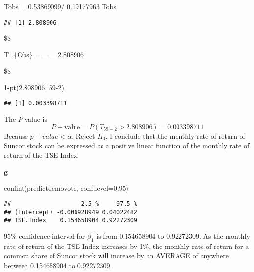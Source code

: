 \documentclass[
]{article}
\newenvironment{Shaded}{\begin{snugshade}}{\end{snugshade}}
\newcommand{\AttributeTok}[1]{\textcolor[rgb]{0.77,0.63,0.00}{#1}}
\newcommand{\DecValTok}[1]{\textcolor[rgb]{0.00,0.00,0.81}{#1}}
\newcommand{\FloatTok}[1]{\textcolor[rgb]{0.00,0.00,0.81}{#1}}
\newcommand{\FunctionTok}[1]{\textcolor[rgb]{0.00,0.00,0.00}{#1}}
\newcommand{\NormalTok}[1]{#1}
\newcommand{\OtherTok}[1]{\textcolor[rgb]{0.56,0.35,0.01}{#1}}
\newcommand{\SpecialCharTok}[1]{\textcolor[rgb]{0.00,0.00,0.00}{#1}}
\begin{document}
\begin{Shaded}
\begin{Highlighting}[]
\NormalTok{Tobs }\OtherTok{=} \FloatTok{0.53869099}\SpecialCharTok{/} \FloatTok{0.19177963}
\NormalTok{Tobs}
\end{Highlighting}
\end{Shaded}

\begin{verbatim}
## [1] 2.808906
\end{verbatim}

\$\$

T\_\{Obs\} =  =
 = 2.808906

\$\$

\begin{Shaded}
\begin{Highlighting}[]
\DecValTok{1}\SpecialCharTok{{-}}\FunctionTok{pt}\NormalTok{(}\FloatTok{2.808906}\NormalTok{, }\DecValTok{59{-}2}\NormalTok{)}
\end{Highlighting}
\end{Shaded}

\begin{verbatim}
## [1] 0.003398711
\end{verbatim}

The \(P\)-value is \[
P-\text{value} = P(T_{59-2} > 2.808906) = 0.003398711
\] Because \(p-value < \alpha\), Reject \(H_{0}\). I conclude that the
monthly rate of return of Suncor stock can be expressed as a positive
linear function of the monthly rate of return of the TSE Index.

\textbf{g}

\begin{Shaded}
\begin{Highlighting}[]
\FunctionTok{confint}\NormalTok{(predictdemovote, }\AttributeTok{conf.level=}\FloatTok{0.95}\NormalTok{)}
\end{Highlighting}
\end{Shaded}

\begin{verbatim}
##                    2.5 %     97.5 %
## (Intercept) -0.006928949 0.04022482
## TSE.Index    0.154658904 0.92272309
\end{verbatim}

95\% confidence interval for \(\beta_{1}\) is from 0.154658904 to
0.92272309. As the monthly rate of return of the TSE Index increases by
1\%, the monthly rate of return for a common share of Suncor stock will
increase by an AVERAGE of anywhere between 0.154658904 to 0.92272309.
\end{document}
